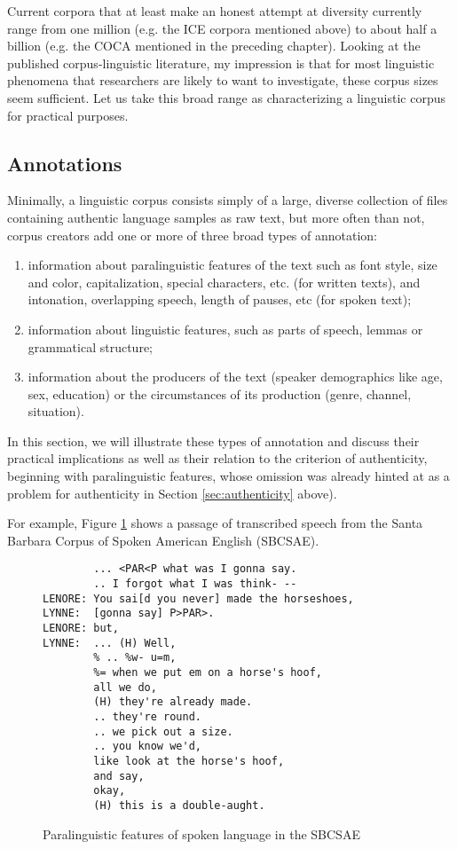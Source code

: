 Current corpora that at least make an honest attempt at diversity currently range from one million (e.g. the ICE corpora mentioned above) to about half a billion (e.g. the COCA mentioned in the preceding chapter). Looking at the published corpus-linguistic literature, my impression is that for most linguistic phenomena that researchers are likely to want to investigate, these corpus sizes seem sufficient. Let us take this broad range as characterizing a linguistic corpus for practical purposes.

\subsection{Annotations}
\label{sec:annotations}

Minimally, a linguistic corpus consists simply of a large, diverse collection of files containing authentic language samples as raw text, but more often than not, corpus creators add one or more of three broad types of annotation:

\begin{enumerate}
\item information about paralinguistic features of the text such as font style, size and color, capitalization, special characters, etc. (for written texts), and intonation, overlapping speech, length of pauses, etc (for spoken text);
\item information about linguistic features, such as parts of speech, lemmas or grammatical structure;
\item information about the producers of the text (speaker demographics like age, sex, education) or the circumstances of its production (genre, channel, situation).
\end{enumerate}

In this section, we will illustrate these types of annotation and discuss their practical implications as well as their relation to the criterion of authenticity, beginning with paralinguistic features, whose omission was already hinted at as a problem for authenticity in Section \ref{sec:authenticity} above).

For example, Figure \ref{fig:sbcsaeparalinguistic} shows a passage of transcribed speech from the Santa Barbara Corpus of Spoken American English (SBCSAE).

\begin{figure}[!htbp]
\caption{Paralinguistic features of spoken language in the SBCSAE}
\label{fig:sbcsaeparalinguistic}
\hrulefill
\begin{verbatim}
        ... <PAR<P what was I gonna say.
        .. I forgot what I was think- --
LENORE: You sai[d you never] made the horseshoes,
LYNNE:  [gonna say] P>PAR>.
LENORE: but,
LYNNE:  ... (H) Well,
        % .. %w- u=m,
        %= when we put em on a horse's hoof,
        all we do,
        (H) they're already made.
        .. they're round.
        .. we pick out a size.
        .. you know we'd,
        like look at the horse's hoof,
        and say,
        okay,
        (H) this is a double-aught.
\end{verbatim}
\hrulefill
\end{figure}

